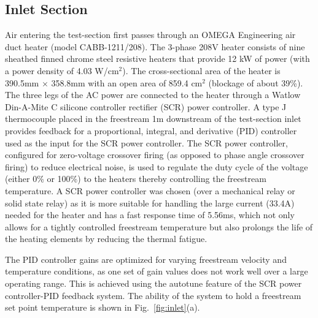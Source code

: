 \subsection{Inlet Section}
Air entering the test-section first passes through an OMEGA Engineering air duct heater (model CABB-1211/208). The 3-phase 208V heater consists of nine sheathed finned chrome steel resistive heaters that provide 12 kW of power (with a power density of 4.03 W/cm$^2$). The cross-sectional area of the heater is 390.5mm $\times$ 358.8mm with an open area of 859.4 cm$^2$ (blockage of about 39\%). The three legs of the AC power are connected to the heater through a Watlow Din-A-Mite C silicone controller rectifier (SCR) power controller. A type J thermocouple placed in the freestream 1m downstream of the test-section inlet provides feedback for a proportional, integral, and derivative (PID) controller used as the input for the SCR power controller. The SCR power controller, configured for zero-voltage crossover firing (as opposed to phase angle crossover firing) to reduce electrical noise, is used to regulate the duty cycle of the voltage (either 0\% or 100\%) to the heaters thereby controlling the freestream temperature.  A SCR power controller was chosen (over a mechanical relay or solid state relay) as it is more suitable for handling the large current (33.4A) needed for the heater and has a fast response time of 5.56ms, which not only allows for a tightly controlled freestream temperature but also prolongs the life of the heating elements by reducing the thermal fatigue.

The PID controller gains are optimized for varying freestream velocity and temperature conditions, as one set of gain values does not work well over a large operating range. This is achieved using the autotune feature of the SCR power controller-PID feedback system. The ability of the system to hold a freestream set point temperature is shown in Fig.~\ref{fig:inlet}(a). 

